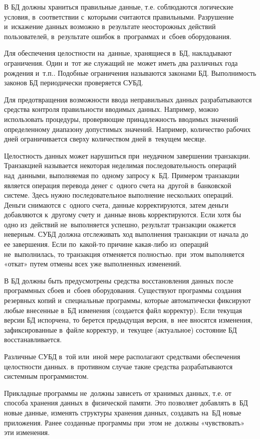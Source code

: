 \documentclass{ou}
\begin{document}
В БД должны храниться правильные данные, т.е. соблюдаются логические условия, в~соответствии с~которыми считаются правильными. Разрушение и~искажение данных возможно в~результате неосторожных действий пользователей, в~результате ошибок в~программах и~сбоев оборудования. 

Для обеспечения целостности на~данные, хранящиеся в~БД, накладывают ограничения. Один и~тот же служащий не~может иметь два различных года рождения и~т.п.. Подобные ограничения называются законами БД. Выполнимость законов БД периодически проверяется СУБД. 

Для предотвращения возможности ввода неправильных данных разрабатываются средства контроля правильности вводимых данных. Например, можно использовать процедуры, проверяющие принадлежность вводимых значений определенному диапазону допустимых значений. Например, количество рабочих дней ограничивается сверху количеством дней в~текущем месяце.

Целостность данных может нарушиться при~неудачном завершении транзакции. Транзакцией называется некоторая неделимая последовательность операций над~данными, выполняемая по~одному запросу к~БД. Примером транзакции является операция перевода денег с~одного счета на~другой в~банковской системе. Здесь нужно последовательное выполнение нескольких операций. Деньги снимаются с~одного счета, данные корректируются, затем деньги добавляются к~другому счету и~данные вновь корректируются. Если хотя бы одно из~действий не~выполняется успешно, результат транзакции окажется неверным. СУБД должна отслеживать ход выполнения транзакции от начала до ее завершения. Если по~какой-то причине какая-либо из~операций не~выполнилась, то транзакция отменяется полностью. при~этом выполняется «откат» путем отмены всех уже выполненных изменений.

В БД должны быть предусмотрены средства восстановления данных после программных сбоев и~сбоев оборудования. Существуют программы создания резервных копий и~специальные программы, которые автоматически фиксируют любые внесенные в~БД изменения (создается файл корректур). Если текущая версии БД испорчена, то берется предыдущая версия, в~нее вносятся изменения, зафиксированные в~файле корректур, и~текущее (актуальное) состояние БД восстанавливается. 

Различные СУБД в~той или~иной мере располагают средствами обеспечения целостности данных. в~противном случае такие средства разрабатываются системным программистом.

Прикладные программы не~должны зависеть от хранимых данных, т.е. от способа хранения данных в~физической памяти. Это позволяет добавлять в~БД новые данные, изменять структуры хранения данных, создавать на~БД новые приложения. Ранее созданные программы при~этом не~должны «чувствовать» эти изменения.  
\end{document}
